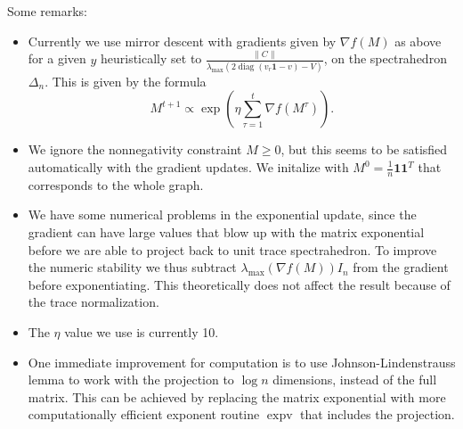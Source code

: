 \documentclass{article}
\begin{document}
Some remarks:
\begin{itemize}
  \item Currently we use mirror descent with gradients given by $\nabla f(M)$ as above for a given $y$ heuristically set to $\frac{\|C\|}{\lambda_{\max} (2 \operatorname{diag}(v_r \bm{1} - v) - V)}$, on the spectrahedron $\Delta_n$. This is given by the formula
    \[ M^{t+1} \propto \exp\left( \eta \sum_{\tau = 1}^t \nabla f(M^\tau) \right). \]
  \item We ignore the nonnegativity constraint $M \geq 0$, but this seems to be satisfied automatically with the gradient updates. We initalize with $M^0 = \frac{1}{n} \bm{1} \bm{1}^T$ that corresponds to the whole graph.
  \item We have some numerical problems in the exponential update, since the gradient can have large values that blow up with the matrix exponential before we are able to project back to unit trace spectrahedron. To improve the numeric stability we thus subtract $\lambda_{\max} (\nabla f(M)) I_n$ from the gradient before exponentiating. This theoretically does not affect the result because of the trace normalization.
  \item The $\eta$ value we use is currently 10.
  \item One immediate improvement for computation is to use Johnson-Lindenstrauss lemma to work with the projection to $\log n$ dimensions, instead of the full matrix. This can be achieved by replacing the matrix exponential with more computationally efficient exponent routine $\operatorname{expv}$ that includes the projection.
\end{itemize}
\end{document}
